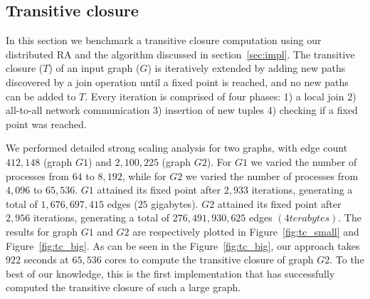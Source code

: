 

\subsection{Transitive closure}
\label{sec:tc}

In this section we benchmark a transitive closure computation using our distributed RA and the algorithm discussed in section~\ref{sec:impl}.
The transitive closure ($T$) of an input graph ($G$) is iteratively extended by adding new paths discovered by a join operation until a fixed point is reached, and no new paths can be added to $T$.
Every iteration is comprised of four phases: 1) a local join 2) all-to-all network communication 3) insertion of new tuples 4) checking if a fixed point was reached.


We performed detailed strong scaling analysis for two graphs, with edge count $412,\!148$ (graph $G1$) and $2,\!100,\!225$ (graph $G2$).
For $G1$ we varied the number of processes from $64$ to $8,\!192$, while for $G2$ we varied the number of processes from $4,096$ to $65,\!536$. 
$G1$ attained its fixed point after $2,\!933$ iterations, generating a total of $1,\!676,\!697,\!415$ edges ($25$ gigabytes).
$G2$ attained its fixed point after $2,\!956$ iterations, generating a total of $276,\!491,\!930,\!625$ edges $(4 terabytes)$.
The results for graph $G1$ and $G2$ are respectively plotted in Figure~\ref{fig:tc_small} and Figure~\ref{fig:tc_big}. As can be seen in the Figure~\ref{fig:tc_big}, our approach takes $922$ seconds at $65,\!536$ cores to compute the transitive closure of graph $G2$. To the best of our knowledge, this is the first implementation that has successfully computed the transitive closure of such a large graph.

